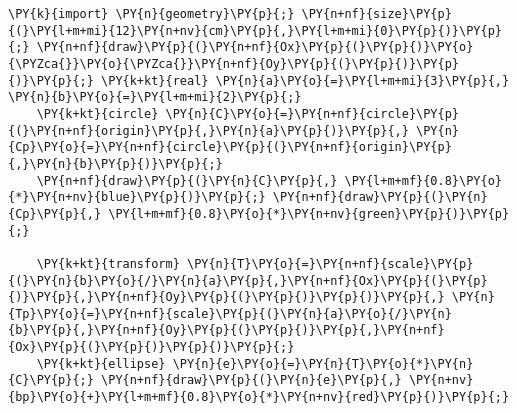 \begin{Verbatim}[commandchars=\\\{\}]
    \PY{k}{import} \PY{n}{geometry}\PY{p}{;} \PY{n+nf}{size}\PY{p}{(}\PY{l+m+mi}{12}\PY{n+nv}{cm}\PY{p}{,}\PY{l+m+mi}{0}\PY{p}{)}\PY{p}{;} \PY{n+nf}{draw}\PY{p}{(}\PY{n+nf}{Ox}\PY{p}{(}\PY{p}{)}\PY{o}{\PYZca{}}\PY{o}{\PYZca{}}\PY{n+nf}{Oy}\PY{p}{(}\PY{p}{)}\PY{p}{)}\PY{p}{;} \PY{k+kt}{real} \PY{n}{a}\PY{o}{=}\PY{l+m+mi}{3}\PY{p}{,} \PY{n}{b}\PY{o}{=}\PY{l+m+mi}{2}\PY{p}{;}
    \PY{k+kt}{circle} \PY{n}{C}\PY{o}{=}\PY{n+nf}{circle}\PY{p}{(}\PY{n+nf}{origin}\PY{p}{,}\PY{n}{a}\PY{p}{)}\PY{p}{,} \PY{n}{Cp}\PY{o}{=}\PY{n+nf}{circle}\PY{p}{(}\PY{n+nf}{origin}\PY{p}{,}\PY{n}{b}\PY{p}{)}\PY{p}{;}
    \PY{n+nf}{draw}\PY{p}{(}\PY{n}{C}\PY{p}{,} \PY{l+m+mf}{0.8}\PY{o}{*}\PY{n+nv}{blue}\PY{p}{)}\PY{p}{;} \PY{n+nf}{draw}\PY{p}{(}\PY{n}{Cp}\PY{p}{,} \PY{l+m+mf}{0.8}\PY{o}{*}\PY{n+nv}{green}\PY{p}{)}\PY{p}{;}

    \PY{k+kt}{transform} \PY{n}{T}\PY{o}{=}\PY{n+nf}{scale}\PY{p}{(}\PY{n}{b}\PY{o}{/}\PY{n}{a}\PY{p}{,}\PY{n+nf}{Ox}\PY{p}{(}\PY{p}{)}\PY{p}{,}\PY{n+nf}{Oy}\PY{p}{(}\PY{p}{)}\PY{p}{)}\PY{p}{,} \PY{n}{Tp}\PY{o}{=}\PY{n+nf}{scale}\PY{p}{(}\PY{n}{a}\PY{o}{/}\PY{n}{b}\PY{p}{,}\PY{n+nf}{Oy}\PY{p}{(}\PY{p}{)}\PY{p}{,}\PY{n+nf}{Ox}\PY{p}{(}\PY{p}{)}\PY{p}{)}\PY{p}{;}
    \PY{k+kt}{ellipse} \PY{n}{e}\PY{o}{=}\PY{n}{T}\PY{o}{*}\PY{n}{C}\PY{p}{;} \PY{n+nf}{draw}\PY{p}{(}\PY{n}{e}\PY{p}{,} \PY{n+nv}{bp}\PY{o}{+}\PY{l+m+mf}{0.8}\PY{o}{*}\PY{n+nv}{red}\PY{p}{)}\PY{p}{;}


\end{Verbatim}
